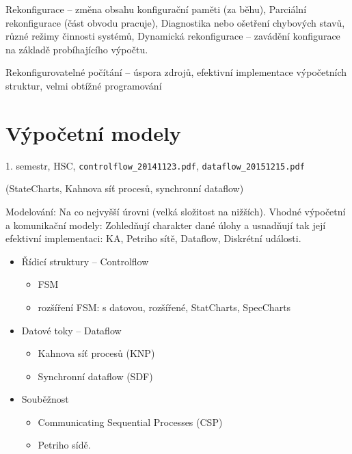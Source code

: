 \documentclass[a4paper, 11pt]{report}
\begin{document}
Rekonfigurace -- změna obsahu konfigurační paměti (za běhu), Parciální rekonfigurace (část obvodu pracuje), Diagnostika nebo ošetření chybových stavů, různé režimy činnosti systémů, Dynamická rekonfigurace -- zavádění konfigurace na základě probíhajícího výpočtu.

Rekonfigurovatelné počítání -- úspora zdrojů, efektivní implementace výpočetních struktur, velmi obtížné programování












\chapter{Výpočetní modely} \label{cha:2}
1. semestr, HSC, \texttt{controlflow\_20141123.pdf}, \texttt{dataflow\_20151215.pdf}

(StateCharts, Kahnova síť procesů, synchronní dataflow)

Modelování: Na co nejvyšší úrovni (velká složitost na nižších). Vhodné výpočetní a komunikační modely: Zohledňují charakter dané úlohy a usnadňují tak její efektivní implementaci: KA, Petriho sítě, Dataflow, Diskrétní události.
\begin{itemize}
	\item Řídicí struktury -- Controlflow
	\begin{itemize}
		\item FSM
		\item rozšíření FSM: s datovou, rozšířené, StatCharts, SpecCharts
	\end{itemize}
	\item Datové toky -- Dataflow
	\begin{itemize}
		\item Kahnova síť procesů (KNP)
		\item Synchronní dataflow (SDF)
	\end{itemize}
	\item Souběžnost
	\begin{itemize}
		\item Communicating Sequential Processes (CSP)
		\item Petriho sídě.
	\end{itemize}
\end{itemize}
\end{document}
